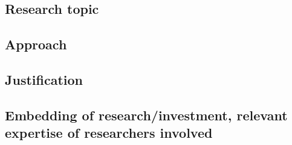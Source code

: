 \documentclass[a4paper,10pt,fleqn]{application}
\begin{document}
\subsection{Research topic}


\subsection{Approach}

\subsection{Justification}



\subsection{Embedding of research/investment, relevant expertise of researchers involved}
\end{document}
